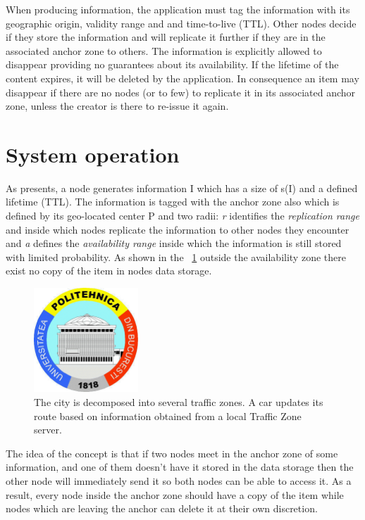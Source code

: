 When producing information, the application must tag the information with its
geographic origin, validity range and and time-to-live (TTL).
Other nodes decide if they store the information and will replicate it further
if they are in the associated anchor zone to others. The information is
explicitly allowed to disappear providing no guarantees about its availability.
If the lifetime of the content expires, it will be deleted by the application.
In consequence an item may disappear if there are no nodes (or to few) to
replicate it in its associated anchor zone, unless the creator is there to
re-issue it again.

\section{System operation}

As \cite{percomfloatingcontent} presents, a node generates information I which
has a size of s(I) and a defined lifetime (TTL). The information is tagged with
the anchor zone also which is defined by its geo-located center P and two radii:
{\it r} identifies the {\it replication range} and inside which nodes replicate
the information to other nodes they encounter and {\it a} defines the
{\it availability range} inside which the information is still stored with
limited probability. As shown in the ~\ref{fig:anchor_zone} outside the
availability zone there exist no copy of the item in nodes data storage.

\begin{figure}[bt]
 \centering
 \includegraphics[width=0.35\textwidth]{img/upb}
 \caption{The city is decomposed into several traffic zones. A car updates its route based on information obtained from a local Traffic Zone server.}
 \label{fig:anchor_zone}
\end{figure}

The idea of the concept is that if two nodes meet in the anchor zone of some
information, and one of them doesn't have it stored in the data storage then the
other node will immediately send it so both nodes can be able to access it. As a
result, every node inside the anchor zone should have a copy of the item while
nodes which are leaving the anchor can delete it at their own discretion.

